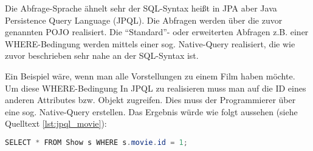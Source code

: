 Die Abfrage-Sprache ähnelt sehr der SQL-Syntax heißt in \ac{JPA} aber Java Persistence Query Language (JPQL). Die Abfragen werden über die zuvor genannten POJO realisiert. Die \enquote{Standard}- oder erweiterten Abfragen z.B. einer WHERE-Bedingung werden mittels einer sog. Native-Query realisiert, die wie zuvor beschrieben sehr nahe an der SQL-Syntax ist.

Ein Beispiel wäre, wenn man alle Vorstellungen zu einem Film haben möchte. Um diese WHERE-Bedingung In JPQL zu realisieren muss man auf die ID eines anderen Attributes bzw. Objekt zugreifen. Dies muss der Programmierer über eine sog. Native-Query erstellen. Das Ergebnis würde wie folgt aussehen (siehe Quelltext \vref{lst:jpql_movie}): 

\begin{lstlisting}[language=JAVA]
SELECT * FROM Show s WHERE s.movie.id = 1; 
\end{lstlisting}
\label{lst:jpql_movie}